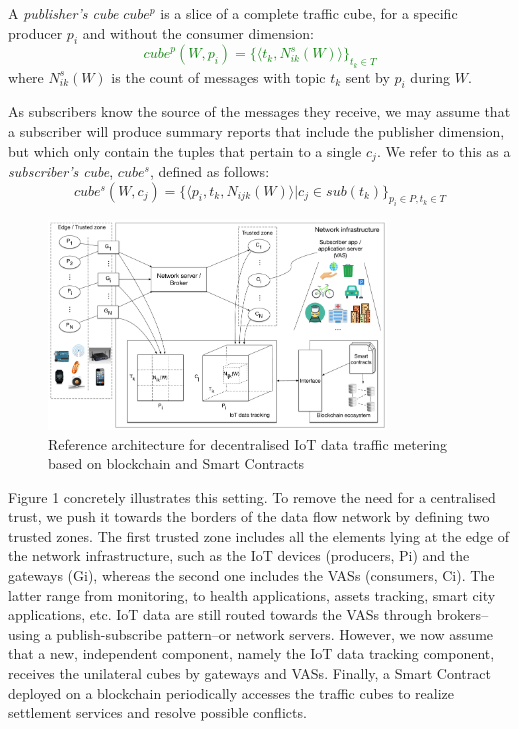 \documentclass[chi_draft]{sigchi}
\begin{document}
A \textit{publisher's cube} $\mathit{cube^p}$ is a slice of a complete traffic cube, for a specific producer $p_i$ and without the consumer dimension:
\textcolor{green}{\[
\mathit{cube}^p(W, p_i)  =  \{ \langle t_k,  N^s_{ik}(W) \rangle \}_{t_k \in T}
\]}
where $N^s_{ik}(W)$ is the count of messages with topic $t_k$ sent by $p_i$ during $W$.

As subscribers know the source of the messages they receive, we may assume that a subscriber will produce summary reports that include the publisher dimension, but which only contain the tuples that pertain to a single $c_j$. We refer to this as a \textit{subscriber's cube}, $ \mathit{cube^s} $, defined as follows:
\[
\mathit{cube^s}(W, c_j)  =  \{ \langle p_i, t_k, N_{ijk}(W) \rangle | c_j \in \mathit{sub}(t_k)\}_{p_i \in P, t_k \in T}
\]

\begin{figure}[!ht]
	\centering
	\includegraphics[width=0.8\textwidth]{figures/IoT-tracking-arch-2}
	\caption{Reference architecture for decentralised IoT data traffic metering based on blockchain and Smart Contracts}
	\label{fig:iot-tracking-arch-2}
\end{figure}

Figure 1 concretely illustrates this setting. To remove the need for a centralised trust, we push it towards the borders of the data flow network by defining two trusted zones. The first trusted zone includes all the elements lying at the edge of the network infrastructure, such as the IoT devices (producers, Pi) and the gateways (Gi), whereas the second one includes the VASs (consumers, Ci). The latter range from monitoring, to health applications, assets tracking, smart city applications, etc. IoT data are still routed towards the VASs through brokers--using a publish-subscribe pattern--or network servers. However, we now assume that a new, independent component, namely the IoT data tracking component, receives the unilateral cubes by gateways and VASs. Finally, a Smart Contract deployed on a blockchain periodically accesses the traffic cubes to realize settlement services and resolve possible conflicts.
\end{document}
